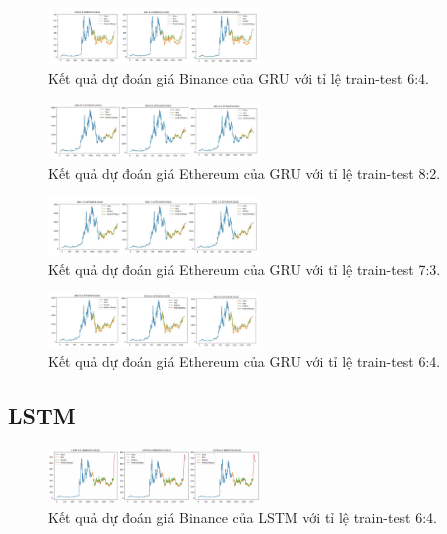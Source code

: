 \documentclass{ieeeojies}
\begin{document}
\begin{figure}[h]
    \centering
    \includegraphics[width=0.5\textwidth]{bibliography/pictures/BNB_GRU_64.jpg}
    \caption{Kết quả dự đoán giá Binance của GRU với tỉ lệ train-test 6:4.}
\end{figure}
\begin{figure}[h]
    \centering
    \includegraphics[width=0.5\textwidth]{bibliography/pictures/ETH_GRU_82.jpg}
    \caption{Kết quả dự đoán giá Ethereum của GRU với tỉ lệ train-test 8:2.}
\end{figure}
\begin{figure}[h]
    \centering
    \includegraphics[width=0.5\textwidth]{bibliography/pictures/ETH_GRU_73.jpg}
    \caption{Kết quả dự đoán giá Ethereum của GRU với tỉ lệ train-test 7:3.}
\end{figure}
\begin{figure}[h]
    \centering
    \includegraphics[width=0.5\textwidth]{bibliography/pictures/ETH_GRU_64.jpg}
    \caption{Kết quả dự đoán giá Ethereum của GRU với tỉ lệ train-test 6:4.}
\end{figure}


\subsection{LSTM}
\begin{figure}[h]
    \centering
    \includegraphics[width=0.5\textwidth]{bibliography/pictures/LSTM 64 BNB.jpg}
    \caption{Kết quả dự đoán giá Binance của LSTM với tỉ lệ train-test 6:4.}
\end{figure}
\end{document}
